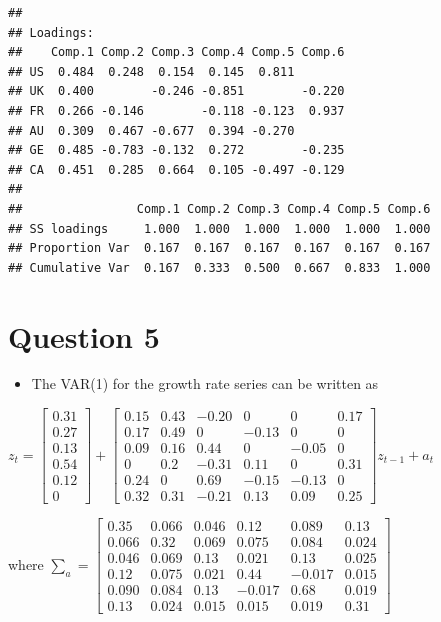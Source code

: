 \documentclass[]{article}
\providecommand{\tightlist}{%
  \setlength{\itemsep}{0pt}\setlength{\parskip}{0pt}}
\begin{document}
\begin{verbatim}
## 
## Loadings:
##    Comp.1 Comp.2 Comp.3 Comp.4 Comp.5 Comp.6
## US  0.484  0.248  0.154  0.145  0.811       
## UK  0.400        -0.246 -0.851        -0.220
## FR  0.266 -0.146        -0.118 -0.123  0.937
## AU  0.309  0.467 -0.677  0.394 -0.270       
## GE  0.485 -0.783 -0.132  0.272        -0.235
## CA  0.451  0.285  0.664  0.105 -0.497 -0.129
## 
##                Comp.1 Comp.2 Comp.3 Comp.4 Comp.5 Comp.6
## SS loadings     1.000  1.000  1.000  1.000  1.000  1.000
## Proportion Var  0.167  0.167  0.167  0.167  0.167  0.167
## Cumulative Var  0.167  0.333  0.500  0.667  0.833  1.000
\end{verbatim}

\section{Question 5}\label{question-5}

\begin{itemize}
\tightlist
\item
  The VAR(1) for the growth rate series can be written as
\end{itemize}

\(z_{t} = \left[\begin{array}{cccccc}0.31\\0.27\\ 0.13\\0.54\\0.12\\0 \end{array}\right] + \left[\begin{array}{rrrrrr}0.15 & 0.43 & -0.20 & 0 & 0 & 0.17 \\0.17 & 0.49 & 0 & -0.13 & 0 & 0 \\0.09 & 0.16 & 0.44 & 0 & -0.05 & 0 \\ 0 & 0.2 & -0.31 & 0.11 & 0 & 0.31\\ 0.24 & 0 & 0.69 & -0.15 & -0.13 & 0 \\ 0.32 & 0.31 & -0.21 & 0.13 & 0.09 & 0.25\end{array}\right]z_{t-1} + a_{t}\)

where
\(\sum_{a} = \left[\begin{array}{rrrrrr}0.35 & 0.066 & 0.046 & 0.12 & 0.089 & 0.13\\0.066 & 0.32 & 0.069 & 0.075 & 0.084 & 0.024 \\ 0.046 & 0.069 & 0.13 & 0.021 & 0.13 & 0.025 \\ 0.12 & 0.075 & 0.021 & 0.44 & -0.017 & 0.015 \\ 0.090 & 0.084 & 0.13 & -0.017 & 0.68 & 0.019 \\ 0.13 & 0.024 & 0.015 & 0.015 & 0.019 & 0.31 \end{array}\right]\)
\end{document}
